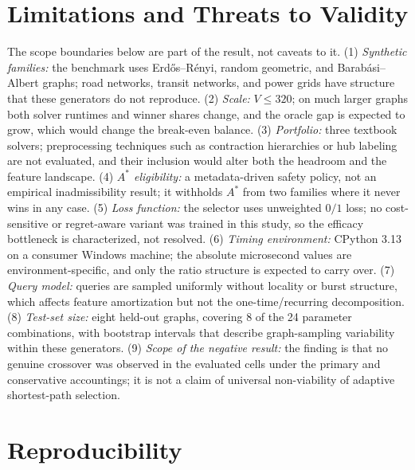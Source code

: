 \documentclass[conference]{IEEEtran}
\begin{document}
\section{Limitations and Threats to Validity}

The scope boundaries below are part of the result, not caveats to it. (1) \emph{Synthetic families:} the benchmark uses Erd\H{o}s--R\'enyi, random geometric, and Barab\'asi--Albert graphs; road networks, transit networks, and power grids have structure that these generators do not reproduce. (2) \emph{Scale:} $V \le 320$; on much larger graphs both solver runtimes and winner shares change, and the oracle gap is expected to grow, which would change the break-even balance. (3) \emph{Portfolio:} three textbook solvers; preprocessing techniques such as contraction hierarchies or hub labeling are not evaluated, and their inclusion would alter both the headroom and the feature landscape. (4) \emph{$A^*$ eligibility:} a metadata-driven safety policy, not an empirical inadmissibility result; it withholds $A^*$ from two families where it never wins in any case. (5) \emph{Loss function:} the selector uses unweighted $0/1$ loss; no cost-sensitive or regret-aware variant was trained in this study, so the efficacy bottleneck is characterized, not resolved. (6) \emph{Timing environment:} CPython 3.13 on a consumer Windows machine; the absolute microsecond values are environment-specific, and only the ratio structure is expected to carry over. (7) \emph{Query model:} queries are sampled uniformly without locality or burst structure, which affects feature amortization but not the one-time/recurring decomposition. (8) \emph{Test-set size:} eight held-out graphs, covering 8 of the 24 parameter combinations, with bootstrap intervals that describe graph-sampling variability within these generators. (9) \emph{Scope of the negative result:} the finding is that no genuine crossover was observed in the evaluated cells under the primary and conservative accountings; it is not a claim of universal non-viability of adaptive shortest-path selection.

\section{Reproducibility}
\label{sec:repro}
\end{document}
